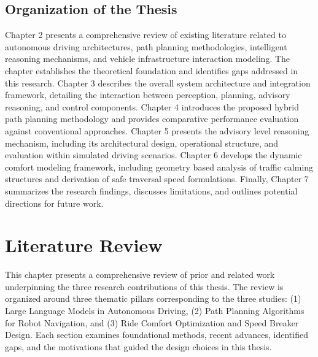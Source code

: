 \documentclass[a4paper,12pt,one side]{report}
\theoremstyle{definition}
\begin{document}
\begin{itemize}
\section{Organization of the Thesis}
Chapter 2 presents a comprehensive review of existing literature related to autonomous driving architectures, path planning methodologies, intelligent reasoning mechanisms, and vehicle infrastructure interaction modeling. The chapter establishes the theoretical foundation and identifies gaps addressed in this research. Chapter 3 describes the overall system architecture and integration framework, detailing the interaction between perception, planning, advisory reasoning, and control components.
Chapter 4 introduces the proposed hybrid path planning methodology and provides comparative performance evaluation against conventional approaches. Chapter 5 presents the advisory level reasoning mechanism, including its architectural design, operational structure, and evaluation within simulated driving scenarios. Chapter 6 develops the dynamic comfort modeling framework, including geometry based analysis of traffic calming structures and derivation of safe traversal speed formulations.
Finally, Chapter 7 summarizes the research findings, discusses limitations, and outlines potential directions for future work.

\newpage
     \chapter{Literature Review }
This chapter presents a comprehensive review of prior and related work underpinning the three research contributions of this thesis. The review is organized around three thematic pillars corresponding to the three studies: (1) Large Language Models in Autonomous Driving, (2) Path Planning Algorithms for Robot Navigation, and (3) Ride Comfort Optimization and Speed Breaker Design. Each section examines foundational methods, recent advances, identified gaps, and the motivations that guided the design choices in this thesis.

\end{itemize}
\end{document}
